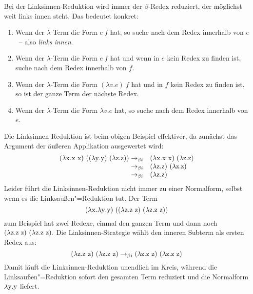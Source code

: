 \begin{definition}
  Bei der Linksinnen-Reduktion wird immer der $\beta$-Redex reduziert,
  der möglichst weit links innen steht.  Das bedeutet konkret:
  \begin{enumerate}
  \item Wenn der $\lambda$-Term die Form $e~f$ hat, so suche nach dem Redex innerhalb
    von $e$~-- also \emph{links innen}.
  \item Wenn der $\lambda$-Term die Form $e~f$ hat und wenn in $e$ kein Redex zu finden
    ist, suche nach dem Redex innerhalb von $f$.
  \item Wenn der $\lambda$-Term die Form $(\lambda v.e)~f$ hat und in
    $f$ kein Redex zu finden ist, so
    ist der ganze Term der nächste Redex.
  \item Wenn der $\lambda$-Term die Form $\lambda v.e$ hat, so suche
    nach dem Redex innerhalb von $e$.
  \end{enumerate}
\end{definition}
%
Die Linksinnen-Reduktion ist beim obigen Beispiel effektiver, da
zunächst das Argument der äußeren Applikation ausgewertet wird:
%
\begin{displaymath}
  \begin{array}{rl}
  (\lambda \mathrm x.\mathrm x~\mathrm x)~((\lambda \mathrm y.\mathrm y)~(\lambda \mathrm z.\mathrm z))
  \rightarrow_{\beta i} & 
  (\lambda \mathrm x.\mathrm x~\mathrm x)~(\lambda \mathrm z.\mathrm z)
  \\
  \rightarrow_{\beta i} & 
  (\lambda \mathrm z.\mathrm z)~(\lambda \mathrm z.\mathrm z)
  \\
  \rightarrow_{\beta i} & 
  (\lambda \mathrm z.\mathrm z)
\end{array}
\end{displaymath}
%
Leider führt die Linksinnen-Reduktion nicht immer zu einer Normalform,
selbst wenn es die Linksaußen"=Reduktion tut.  Der Term
\[ (\lambda \mathrm x.\lambda \mathrm y.\mathrm y)~((\lambda \mathrm z.\mathrm z~\mathrm z)~(\lambda \mathrm z.\mathrm z~\mathrm z)) \]
zum Beispiel hat zwei Redexe, einmal den ganzen Term und dann noch
$(\lambda \mathrm z.\mathrm z~\mathrm z)~(\lambda \mathrm z.\mathrm z~\mathrm z).$  Die Linksinnen-Strategie wählt
den inneren Subterm als ersten Redex aus:
%
\begin{displaymath}
  (\lambda \mathrm z.\mathrm z~\mathrm z)~(\lambda \mathrm z.\mathrm z~\mathrm z)
\rightarrow_{\beta i}
  (\lambda \mathrm z.\mathrm z~\mathrm z)~(\lambda \mathrm z.\mathrm z~\mathrm z)
\end{displaymath}
%
Damit läuft die Linksinnen-Reduktion unendlich im Kreis, während
die Linksaußen"=Reduktion sofort den gesamten Term reduziert und die
Normalform $\lambda \mathrm y.\mathrm y$ liefert.

